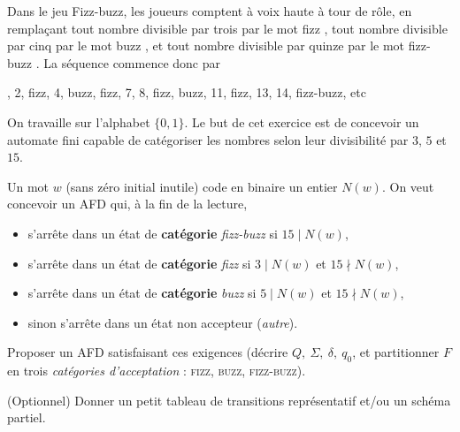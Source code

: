 
\begingroup

\begin{exercice}\label{exo:lexing/automata/challenge}
  
  Dans le jeu Fizz-buzz, les joueurs comptent à voix haute à tour de rôle, en remplaçant
  tout nombre divisible par trois par le mot \og fizz \fg,
  tout nombre divisible par cinq par le mot \og buzz \fg,
  et tout nombre divisible par quinze par le mot \og fizz-buzz \fg.
  La séquence commence donc par
  \begin{center}
    , 2, fizz, 4, buzz, fizz, 7, 8, fizz, buzz, 11, fizz, 13, 14, fizz-buzz, etc \fg
  \end{center}
  
  On travaille sur l'alphabet $\{0,1\}$.
  Le but de cet exercice est de concevoir un automate fini capable de catégoriser
  les nombres selon leur divisibilité par $3$, $5$ et $15$. 
  
  Un mot $w$ (sans zéro initial inutile) code en binaire un entier $N(w)$.
  On veut concevoir un AFD qui, à la fin de la lecture,
  \begin{itemize}
  \item s'arrête dans un état de \textbf{catégorie} \emph{fizz-buzz} si $15 \mid N(w)$,
  \item s'arrête dans un état de \textbf{catégorie} \emph{fizz} si $3 \mid N(w)$ et $15 \nmid N(w)$,
  \item s'arrête dans un état de \textbf{catégorie} \emph{buzz} si $5 \mid N(w)$ et $15 \nmid N(w)$,
  \item sinon s'arrête dans un état non accepteur (\emph{autre}).
  \end{itemize}
  
  \begin{questions}
  \item Proposer un AFD satisfaisant ces exigences (décrire $Q,\ \Sigma,\ \delta,\ q_0$, et partitionner $F$ en trois \emph{catégories d’acceptation} : \textsc{fizz}, \textsc{buzz}, \textsc{fizz-buzz}).
  \item (Optionnel) Donner un petit tableau de transitions représentatif et/ou un schéma partiel.
  \end{questions}
  
\end{exercice}

